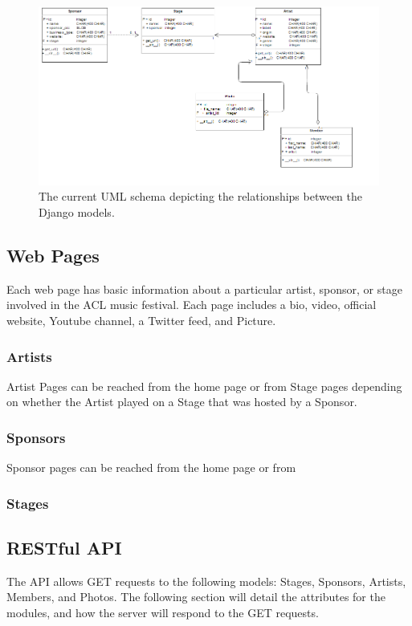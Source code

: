\documentclass[12pt,english]{scrartcl}
\begin{document}
\begin{figure}[h!]
\includegraphics[width=\textwidth]{UML}
 \caption{The current UML schema depicting the relationships between the Django models.}
\end{figure}

\subsection{Web Pages}
Each web page has basic information about a particular artist, sponsor, or stage involved in the ACL music festival.
Each page includes a bio, video, official website, Youtube channel, a Twitter feed, and Picture.
\subsubsection{Artists}
Artist Pages can be reached from the home page or from Stage pages depending on whether the Artist played on
a Stage that was hosted by a Sponsor. 
\subsubsection{Sponsors}
Sponsor pages can be reached from the home page or from 

\subsubsection{Stages}


\subsection{RESTful  API}
The API allows GET requests to the following models: Stages, Sponsors, Artists, Members, and  Photos.
The following section will detail the attributes for the modules, and how the server will respond to the GET requests.
\end{document}
